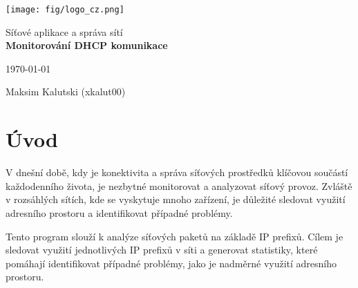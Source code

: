 \documentclass[a4paper, 11pt]{article}
\begin{document}
    \begin{titlepage}
        \begin{center}
            \texttt{[image: fig/logo\_cz.png]} \\


            \Huge Síťové aplikace a správa sítí \\
            \LARGE \textbf{Monitorování DHCP komunikace} \\

        \end{center}

        \vfill

        \begin{minipage}{0.4\textwidth}
            \Large \today
        \end{minipage}
        \begin{minipage}[b]{0.5\textwidth}
            \begin{flushright}
                \Large
                Maksim Kalutski (xkalut00) \\
            \end{flushright}
        \end{minipage}
    \end{titlepage}




    \setcounter{page}{1}
    \tableofcontents
    \clearpage



    \setcounter{page}{1}

    \section{Úvod}
    V dnešní době, kdy je konektivita a správa síťových prostředků klíčovou součástí každodenního života, je nezbytné monitorovat a analyzovat síťový provoz. Zvláště v rozsáhlých sítích, kde se vyskytuje mnoho zařízení, je důležité sledovat využití adresního prostoru a identifikovat případné problémy.

    Tento program slouží k analýze síťových paketů na základě IP prefixů. Cílem je sledovat využití jednotlivých IP prefixů v síti a generovat statistiky, které pomáhají identifikovat případné problémy, jako je nadměrné využití adresního prostoru.
\end{document}
